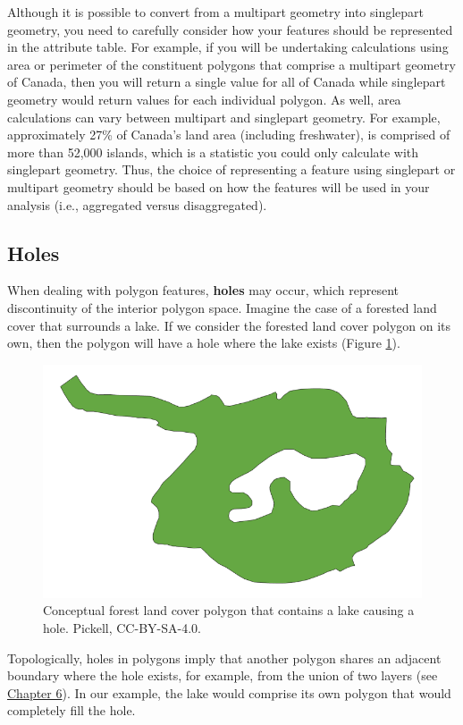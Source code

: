 \documentclass[
]{book}
\begin{document}
Although it is possible to convert from a multipart geometry into singlepart geometry, you need to carefully consider how your features should be represented in the attribute table. For example, if you will be undertaking calculations using area or perimeter of the constituent polygons that comprise a multipart geometry of Canada, then you will return a single value for all of Canada while singlepart geometry would return values for each individual polygon. As well, area calculations can vary between multipart and singlepart geometry. For example, approximately 27\% of Canada's land area (including freshwater), is comprised of more than 52,000 islands, which is a statistic you could only calculate with singlepart geometry. Thus, the choice of representing a feature using singlepart or multipart geometry should be based on how the features will be used in your analysis (i.e., aggregated versus disaggregated).

\subsection{Holes}\label{holes}

When dealing with polygon features, \textbf{holes} may occur, which represent discontinuity of the interior polygon space. Imagine the case of a forested land cover that surrounds a lake. If we consider the forested land cover polygon on its own, then the polygon will have a hole where the lake exists (Figure \ref{fig:7-hole}).

\begin{figure}
\includegraphics[width=0.5\linewidth]{images/07-hole} \caption{Conceptual forest land cover polygon that contains a lake causing a hole. Pickell, CC-BY-SA-4.0.}\label{fig:7-hole}
\end{figure}

Topologically, holes in polygons imply that another polygon shares an adjacent boundary where the hole exists, for example, from the union of two layers (see \href{https://ubc-geomatics-textbook.github.io/geomatics-textbook/overlay-and-proximity-analysis.html}{Chapter 6}). In our example, the lake would comprise its own polygon that would completely fill the hole.
\end{document}
